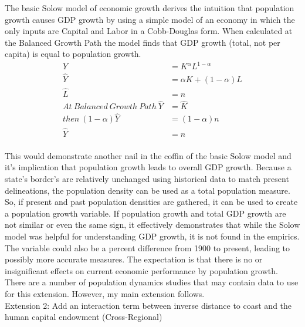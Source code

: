 \documentclass[12pt]{article}
\begin{document}
{The basic Solow model of economic growth derives the intuition that population growth causes GDP growth by using a simple model of an economy in which the only inputs are Capital and Labor in a Cobb-Douglas form. When calculated at the Balanced Growth Path the model finds that GDP growth (total, not per capita) is equal to population growth.\\

\begin{equation}
\begin{split}
Y & = K^{\alpha}L^{1 - \alpha}\\
\hat Y  & =  \alpha K + (1 - \alpha) L\\
\hat L & = n\\
At \ Balanced \ Growth \ Path \ \hat Y & = \hat K \\
then \ (1 - \alpha)\hat Y & = (1 - \alpha) n\\
\hat Y & = n\\
\end{split}
\end{equation}

This would demonstrate another nail in the coffin of the basic Solow model and it's implication that population growth leads to overall GDP growth. Because a state's border's are relatively unchanged using historical data to match present delineations, the population density can be used as a total population measure. So, if present and past population densities are gathered, it can be used to create a population growth variable. If population growth and total GDP growth are not similar or even the same sign, it effectively demonstrates that while the Solow model was helpful for understanding GDP growth, it is not found in the empirics. The variable could also be a percent difference from 1900 to present, leading to possibly more accurate measures. The expectation is that there is no or insignificant effects on current economic performance by population growth. There are a number of population dynamics studies that may contain data to use for this extension. However, my main extension follows.\\

Extension 2:  Add an interaction term between inverse distance to coast and the human capital endowment (Cross-Regional)\\

}
\end{document}

